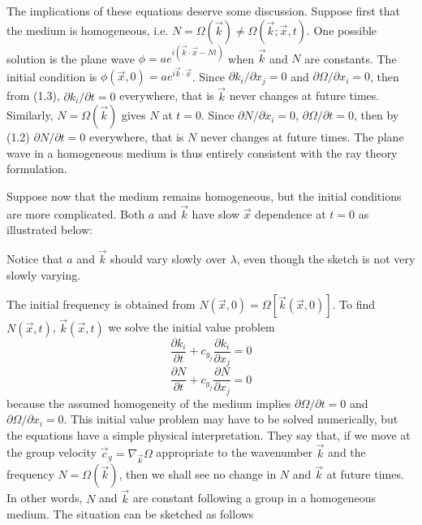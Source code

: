 The implications of these equations deserve some discussion. Suppose first that the
medium is homogeneous, i.e. $N=\Omega(\vec{k})\ne\Omega(\vec{k};\vec{x},t)$. One
possible solution is the plane wave
$\phi=ae^{i(\vec{k}\cdot\vec{x}-Nt)}$ when $\vec{k}$ and $N$ are constants. The
initial condition is $\phi(\vec{x},0)=ae^{i\vec{k}\cdot\vec{x}}$. Since
$\partial k_i/\partial x_j=0$ and $\partial\Omega/\partial x_i=0$, then from (1.3),
$\partial k_i/\partial t=0$ everywhere, that is $\vec{k}$ never changes at future times.
Similarly, $N=\Omega(\vec{k})$ gives $N$ at $t=0$. Since
$\partial N/\partial x_i=0$, $\partial\Omega/\partial t=0$, then by (1.2)
$\partial N/\partial t=0$ everywhere, that is $N$ never changes at future times. The
plane wave in a homogeneous medium is thus entirely consistent with the ray theory
formulation.

Suppose now that the medium remains homogeneous, but the initial conditions are more
complicated. Both $a$ and $\vec{k}$ have slow $\vec{x}$ dependence at $t=0$ as
illustrated below:

\sourcepagebreak


Notice that $a$ and $\vec{k}$ should vary slowly over $\lambda$, even though the sketch
is not very slowly varying.

The initial frequency is obtained from
$N(\vec{x},0)=\Omega[\vec{k}(\vec{x},0)]$. To find
$N(\vec{x},t)$, $\vec{k}(\vec{x},t)$ we solve the initial value problem
\[
	\frac{\partial k_i}{\partial t}
	+c_{g_j}\frac{\partial k_i}{\partial x_j}=0
\]
\[
	\frac{\partial N}{\partial t}
	+c_{g_j}\frac{\partial N}{\partial x_j}=0
\]
because the assumed homogeneity of the medium implies
$\partial\Omega/\partial t=0$ and $\partial\Omega/\partial x_i=0$. This initial value
problem may have to be solved numerically, but the equations have a simple physical
interpretation. They say that, if we move at the group velocity
$\vec{c}_g=\nabla_{\vec{k}}\Omega$ appropriate to the wavenumber $\vec{k}$ and the
frequency $N=\Omega(\vec{k})$, then we shall see no change in $N$ and $\vec{k}$ at
future times. In other words, $N$ and $\vec{k}$ are constant following a group in a
homogeneous medium. The situation can be sketched as follows

